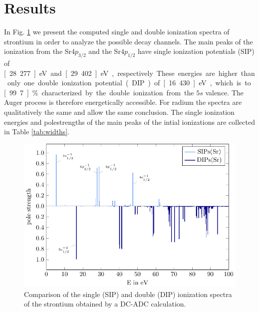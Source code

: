 \section{Results}
\label{section:results}

In Fig. \ref{fig:sdip} we present the computed
single and double ionization spectra
of strontium in order to analyze the possible decay channels. The main peaks of the
ionization
from the Sr$4p_{3/2}$ and the Sr$4p_{1/2}$ have single ionization potentials (SIP)
of \unit[28.277]{eV} and \unit[29.402]{eV}, respectively. These energies are higher
than only one double ionization potential (DIP) of \unit[16.430]{eV},
which is to \unit[99.7]{\%} characterized by the double ionization from
the $5s$ valence. The Auger process is therefore energetically accessible.
For radium the spectra are qualitatively the same and
allow the same conclusion. The single ionization energies and polestrengths
of the main
peaks of the intial ionizations are collected in Table \ref{tab:widths}.

\begin{figure}[h]
 \centering
 \includegraphics[width=\columnwidth]{pics/Sr_rel_sdip.pdf}
 \caption{Comparison of the single (SIP) and double (DIP) ionization spectra
          of the strontium obtained by a DC-ADC calculation.}
 \label{fig:sdip}
\end{figure}



